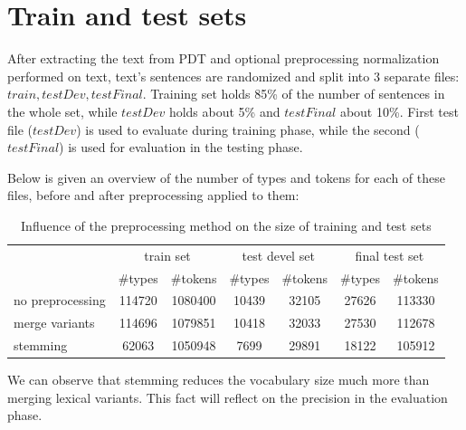 \section{Train and test sets}\label{trainTestSet}

After extracting the text from PDT and optional preprocessing normalization performed on text, text's 
sentences are randomized and split into 3 separate files: $train, testDev, testFinal$. Training set holds 
85\% of the number of sentences in the whole set, while $testDev$ holds about 5\% and $testFinal$ 
about 10\%. First test file 
($testDev$) is used to evaluate during training phase, while the second ($ testFinal$) is used for 
evaluation in the testing phase. 

Below is given an overview of the number of types and tokens for each of these files, before and after 
preprocessing applied to them:

\begin{table}[h!]
\begin{tabular}{ l | c c | c c | c c|}
& \multicolumn{2}{|c}{train set} & \multicolumn{2}{|c}{test devel set} & \multicolumn{2}{|c|}{final test set} \\
   &  \#types & \#tokens  &  \#types & \#tokens  &  \#types & \#tokens \\
  \hline                       
  no preprocessing & 114720 & 1080400 & 10439 & 32105 & 27626 & 113330\\
  merge variants & 114696 & 1079851 & 10418 &  32033 & 27530 &112678\\
  stemming & 62063 & 1050948 & 7699 & 29891 & 18122 & 105912\\
\end{tabular}
\caption{Influence of the preprocessing method on the size of training and test sets}
\end{table}
We can observe that stemming reduces the vocabulary size much more than merging 
lexical variants. This fact will reflect on the precision in the evaluation phase. 

